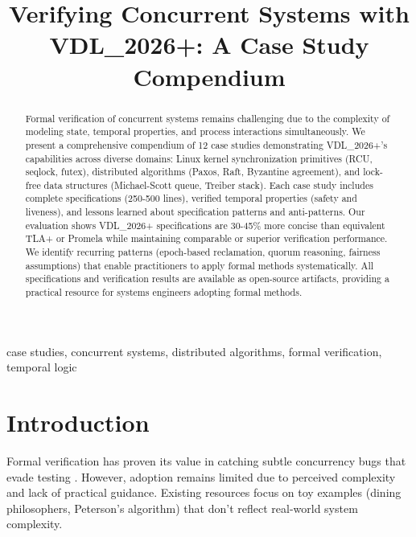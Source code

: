 \documentclass[conference]{IEEEtran}
\begin{document}
\title{Verifying Concurrent Systems with VDL\_2026+: A Case Study Compendium}

\author{}

\maketitle

\begin{abstract}
Formal verification of concurrent systems remains challenging due to the complexity of modeling state, temporal properties, and process interactions simultaneously. We present a comprehensive compendium of 12 case studies demonstrating VDL\_2026+'s capabilities across diverse domains: Linux kernel synchronization primitives (RCU, seqlock, futex), distributed algorithms (Paxos, Raft, Byzantine agreement), and lock-free data structures (Michael-Scott queue, Treiber stack). Each case study includes complete specifications (250-500 lines), verified temporal properties (safety and liveness), and lessons learned about specification patterns and anti-patterns. Our evaluation shows VDL\_2026+ specifications are 30-45\% more concise than equivalent TLA+ or Promela while maintaining comparable or superior verification performance. We identify recurring patterns (epoch-based reclamation, quorum reasoning, fairness assumptions) that enable practitioners to apply formal methods systematically. All specifications and verification results are available as open-source artifacts, providing a practical resource for systems engineers adopting formal methods.
\end{abstract}

\begin{IEEEkeywords}
case studies, concurrent systems, distributed algorithms, formal verification, temporal logic
\end{IEEEkeywords}

\section{Introduction}

Formal verification has proven its value in catching subtle concurrency bugs that evade testing \cite{newcombe2015}. However, adoption remains limited due to perceived complexity and lack of practical guidance. Existing resources focus on toy examples (dining philosophers, Peterson's algorithm) that don't reflect real-world system complexity.
\end{document}
